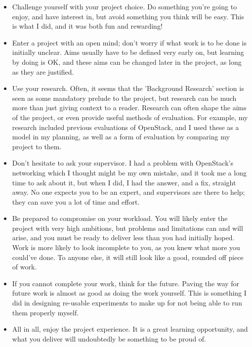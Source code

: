 \begin{itemize}
\itemsep1em
\item Challenge yourself with your project choice. Do something you're going to enjoy, and have interest in, but avoid something you think will be easy. This is what I did, and it was both fun and rewarding! 

\item Enter a project with an open mind; don't worry if what work is to be done is initially unclear. Aims usually have to be defined very early on, but learning by doing is OK, and these aims can be changed later in the project, as long as they are justified. 

\item Use your research. Often, it seems that the 'Background Research' section is seen as some mandatory prelude to the project, but research can be much more than just giving context to a reader. Research can often shape the aims of the project, or even provide useful methods of evaluation. For example, my research included previous evaluations of OpenStack, and I used these as a model in my planning, as well as a form of evaluation by comparing my project to them. 

\item Don't hesitate to ask your supervisor. I had a problem with OpenStack's networking which I thought might be my own mistake, and it took me a long time to ask about it, but when I did, I had the answer, and a fix, straight away. No one expects you to be an expert, and supervisors are there to help; they can save you a lot of time and effort.  

\item Be prepared to compromise on your workload. You will likely enter the project with very high ambitions, but problems and limitations can and will arise, and you must be ready to deliver less than you had initially hoped. Work is more likely to look incomplete to you, as you knew what more you could've done. To anyone else, it will still look like a good, rounded off piece of work. 

\item If you cannot complete your work, think for the future. Paving the way for future work is almost as good as doing the work yourself. This is something I did in designing re-usable experiments to make up for not being able to run them properly myself. 

\item All in all, enjoy the project experience. It is a great learning opportunity, and what you deliver will undoubtedly be something to be proud of. 

\end{itemize}